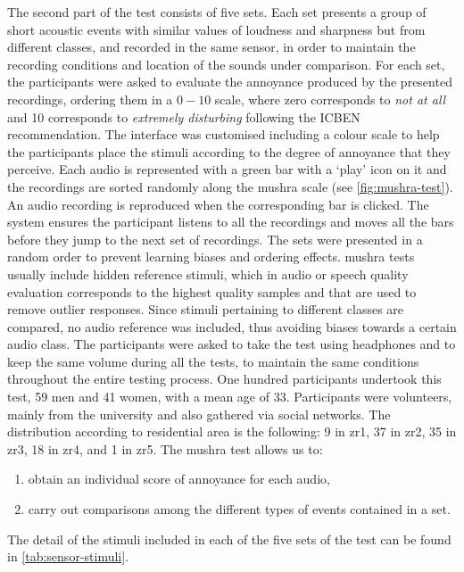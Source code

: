 The second part of the test consists of five sets. Each set presents a group of short acoustic events with similar values of loudness and sharpness but from different classes, and recorded in the same sensor, in order to maintain the recording conditions and location of the sounds under comparison. For each set, the participants were asked to evaluate the annoyance produced by the presented recordings, ordering them in a $0-10$ scale, where zero corresponds to \emph{not at all} and 10 corresponds to \emph{extremely disturbing} following the ICBEN recommendation. The interface was customised including a colour scale to help the participants place the stimuli according to the degree of annoyance that they perceive. Each audio is represented with a green bar with a `play' icon on it and the recordings are sorted randomly along the \gls{mushra} scale (see \cref{fig:mushra-test}). An audio recording is reproduced when the corresponding bar is clicked. The system ensures the participant listens to all the recordings and moves all the bars before they jump to the next set of recordings. The sets were presented in a random order to prevent learning biases and ordering effects. \gls{mushra} tests usually include hidden reference stimuli, which in audio or speech quality evaluation corresponds to the highest quality samples and that are used to remove outlier responses. Since stimuli pertaining to different classes are compared, no audio reference was included, thus avoiding biases towards a certain audio class. The participants were asked to take the test using headphones and to keep the same volume during all the tests, to maintain the same conditions throughout the entire testing process. One hundred participants undertook this test, 59 men and 41 women, with a mean age of 33. Participants were volunteers, mainly from the university and also gathered via social networks. The distribution according to residential area is the following: 9 in zr1, 37 in zr2, 35 in zr3, 18 in zr4, and 1 in zr5. The \gls{mushra} test allows us to:

\begin{enumerate}
  \item obtain an individual score of annoyance for each audio,
  \item carry out comparisons among the different types of events contained in a set.
\end{enumerate}

The detail of the stimuli included in each of the five sets of the test can be found in \cref{tab:sensor-stimuli}.

